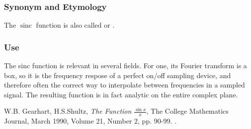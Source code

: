 \documentclass[12pt]{article}
\begin{document}
\subsubsection*{Synonym and Etymology}
The $\operatorname{sinc}$ function is also 
called 
or  .

\subsubsection*{Use}

The sinc function is relevant in several fields.  For one, its Fourier transform is a box, so it is the frequency respose of a perfect on/off sampling device, and therefore often the correct way to interpolate between frequencies in a sampled signal.  The resulting function is in fact analytic on the entire complex plane.

\begin{thebibliography}{9}
  W.B. Gearhart, H.S.Shultz, \emph{The Function $\frac{\sin x }{x}$},
The College Mathematics Journal, March 1990, Volume 21, Number 2, pp. 90-99.
.
 \end{thebibliography}
\end{document}
